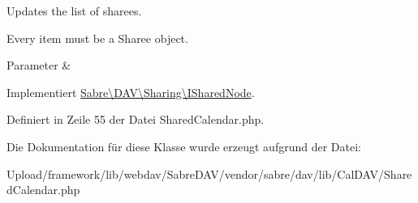 Updates the list of sharees.

Every item must be a Sharee object.


\begin{DoxyParams}{Parameter}
{\em } & \\
\hline
\end{DoxyParams}


Implementiert \mbox{\hyperlink{interface_sabre_1_1_d_a_v_1_1_sharing_1_1_i_shared_node_a76948a1464503ea23d3dd8ff51b561ce}{Sabre\textbackslash{}\+D\+A\+V\textbackslash{}\+Sharing\textbackslash{}\+I\+Shared\+Node}}.



Definiert in Zeile 55 der Datei Shared\+Calendar.\+php.



Die Dokumentation für diese Klasse wurde erzeugt aufgrund der Datei\+:\begin{DoxyCompactItemize}
\item 
Upload/framework/lib/webdav/\+Sabre\+D\+A\+V/vendor/sabre/dav/lib/\+Cal\+D\+A\+V/Shared\+Calendar.\+php\end{DoxyCompactItemize}
